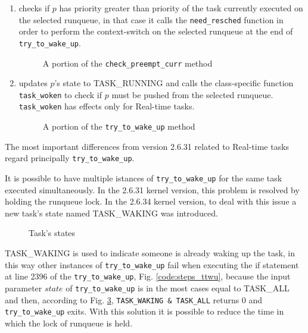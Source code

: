 \begin{enumerate}
\item checks if $p$ has priority greater than priority of the task currently
executed on the selected runqueue, in that case it calls the \texttt{need\_resched}
function in order to perform the context-switch on the selected runqueue at the
end of \texttt{try\_to\_wake\_up}.

\begin{figure}[h]
  \lstset{basicstyle=\footnotesize, language=c, captionpos=b, frame=single,label=lis:steps}
  
  \label{code:prio_ttwu}
  \caption{A portion of the \texttt{check\_preempt\_curr} method}
\end{figure}

\item updates $p$'s state to TASK\_RUNNING and calls the class-specific function 
\texttt{task\_woken} to check if $p$ must be pushed from the selected runqueue.
\texttt{task\_woken} has effects only for Real-time tasks.

\begin{figure}[h]
  \lstset{basicstyle=\footnotesize, language=c, captionpos=b, frame=single,label=lis:steps}
  
  \label{code:final_ttwu}
  \caption{A portion of the \texttt{try\_to\_wake\_up} method}
\end{figure}

\end{enumerate}

The most important differences from version 2.6.31 related to Real-time tasks regard principally \texttt{try\_to\_wake\_up}.

It is possible to have multiple istances of \texttt{try\_to\_wake\_up} for the same task executed simultaneously. In the 2.6.31 kernel version, 
this problem is resolved by holding the runqueue lock. In the 2.6.34 kernel version, to deal with this issue a new task's state named TASK\_WAKING 
was introduced.

\begin{figure}[h]
  \lstset{basicstyle=\footnotesize, language=c, captionpos=b, frame=single,label=lis:steps}
  
  \label{code:task_states}
  \caption{Task's states}
\end{figure}

TASK\_WAKING is used to indicate someone is already waking up the task, in this way other instances of \texttt{try\_to\_wake\_up} fail when executing 
the if statement at line 2396 of the \texttt{try\_to\_wake\_up}, Fig. \ref{code:steps_ttwu}, because the input parameter $state$ of 
\texttt{try\_to\_wake\_up} is in the most cases equal to TASK\_ALL and then, according to Fig. \ref{code:task_states}, 
\texttt{TASK\_WAKING \& TASK\_ALL} returns 0 and \texttt{try\_to\_wake\_up} exits. With this solution it is possible to reduce the time in which the 
lock of runqueue is held. 

